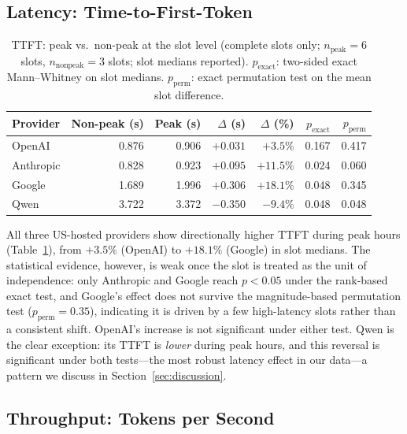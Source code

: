 \documentclass[11pt]{article}
\begin{document}
\subsection{Latency: Time-to-First-Token}

\begin{table}[h]
\centering
\caption{TTFT: peak vs.\ non-peak at the slot level (complete slots only;
$n_\text{peak}=6$ slots, $n_\text{nonpeak}=3$ slots; slot medians reported).
$p_\text{exact}$: two-sided exact Mann--Whitney on slot medians.
$p_\text{perm}$: exact permutation test on the mean slot difference.}
\label{tab:ttft}
\begin{tabular}{lrrrrrr}
\toprule
\textbf{Provider} & \textbf{Non-peak (s)} & \textbf{Peak (s)}
  & \textbf{$\Delta$ (s)} & \textbf{$\Delta$ (\%)}
  & \textbf{$p_\text{exact}$} & \textbf{$p_\text{perm}$} \\
\midrule
OpenAI    & 0.876 & 0.906 & $+0.031$ & $+3.5\%$  & 0.167 & 0.417 \\
Anthropic & 0.828 & 0.923 & $+0.095$ & $+11.5\%$ & 0.024 & 0.060 \\
Google    & 1.689 & 1.996 & $+0.306$ & $+18.1\%$ & 0.048 & 0.345 \\
Qwen      & 3.722 & 3.372 & $-0.350$ & $-9.4\%$  & 0.048 & 0.048 \\
\bottomrule
\end{tabular}
\end{table}

All three US-hosted providers show directionally higher TTFT during peak hours
(Table~\ref{tab:ttft}), from $+3.5\%$ (OpenAI) to $+18.1\%$ (Google) in slot medians.
The statistical evidence, however, is weak once the slot is treated as the unit of
independence: only Anthropic and Google reach $p<0.05$ under the rank-based exact test,
and Google's effect does not survive the magnitude-based permutation test
($p_\text{perm}=0.35$), indicating it is driven by a few high-latency slots rather than a
consistent shift. OpenAI's increase is not significant under either test.
Qwen is the clear exception: its TTFT is \emph{lower} during peak hours, and this reversal
is significant under both tests---the most robust latency effect in our data---a pattern we
discuss in Section~\ref{sec:discussion}.

\subsection{Throughput: Tokens per Second}
\end{document}
